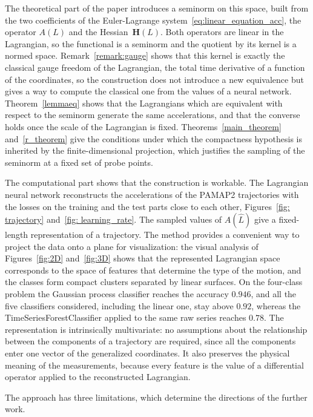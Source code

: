 \documentclass[sn-mathphys-num]{sn-jnl}
\theoremstyle{thmstylethree}
\theoremstyle{thmstyletwo}
\theoremstyle{thmstyleone}
\begin{document}
The theoretical part of the paper introduces a seminorm on this space, built from the two coefficients of the Euler-Lagrange system~\eqref{eq:linear_equation_acc}, the operator $A(L)$ and the Hessian~$\mathbf{H}(L)$. Both operators are linear in the Lagrangian, so the functional is a seminorm and the quotient by its kernel is a normed space. Remark~\ref{remark:gauge} shows that this kernel is exactly the classical gauge freedom of the Lagrangian, the total time derivative of a function of the coordinates, so the construction does not introduce a new equivalence but gives a way to compute the classical one from the values of a neural network. Theorem~\ref{lemmaeq} shows that the Lagrangians which are equivalent with respect to the seminorm generate the same accelerations, and that the converse holds once the scale of the Lagrangian is fixed. Theorems~\ref{main_theorem} and~\ref{r_theorem} give the conditions under which the compactness hypothesis is inherited by the finite-dimensional projection, which justifies the sampling of the seminorm at a fixed set of probe points.

The computational part shows that the construction is workable. The Lagrangian neural network reconstructs the accelerations of the PAMAP2 trajectories with the losses on the training and the test parts close to each other, Figures~\ref{fig: trajectory} and~\ref{fig: learning_rate}. The sampled values of $A(\hat{L})$ give a fixed-length representation of a trajectory. The method provides a convenient way to project the data onto a plane for visualization: the visual analysis of Figures~\ref{fig:2D} and~\ref{fig:3D} shows that the represented Lagrangian space corresponds to the space of features that determine the type of the motion, and the classes form compact clusters separated by linear surfaces. On the four-class problem the Gaussian process classifier reaches the accuracy $0.946$, and all the five classifiers considered, including the linear one, stay above $0.92$, whereas the TimeSeriesForestClassifier applied to the same raw series reaches $0.78$. The representation is intrinsically multivariate: no assumptions about the relationship between the components of a trajectory are required, since all the components enter one vector of the generalized coordinates. It also preserves the physical meaning of the measurements, because every feature is the value of a differential operator applied to the reconstructed Lagrangian.

The approach has three limitations, which determine the directions of the further work.
\end{document}
